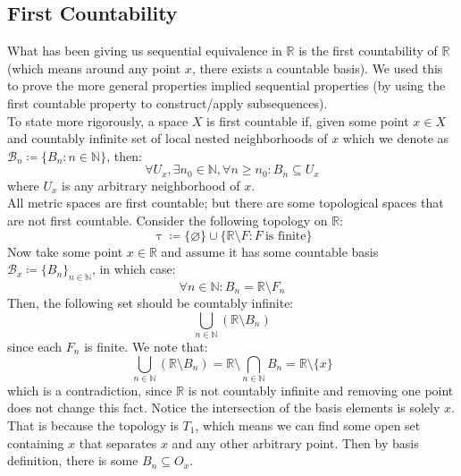 \documentclass[10pt,letterpaper]{article} %
\begin{document}
\subsection{First Countability}
What has been giving us sequential equivalence in $\mathbb{R}$ is the first countability of $\mathbb{R}$ (which means around any point $x$, there exists a countable basis). We used this to prove the more general properties implied sequential properties (by using the first countable property to construct/apply subsequences).\\

To state more rigorously, a space $X$ is first countable if, given some point $x \in X$ and countably infinite set of local nested neighborhoods of $x$ which we denote as $\mathcal{B}_n \coloneq \{B_n : n \in \mathbb{N}\}$, then:
\begin{equation*}
\forall U_x, \exists n_0 \in \mathbb{N}, \forall n \geqslant n_0: B_n \subseteq U_x
\end{equation*}
where $U_x$ is any arbitrary neighborhood of $x$.\\

All metric spaces are first countable; but there are some topological spaces that are not first countable. Consider the following topology on $\mathbb{R}$:
\begin{equation*}
\uptau \coloneq \{\varnothing\} \cup \{\mathbb{R} \setminus F: F \ \text{is finite}\}
\end{equation*}
Now take some point $x \in \mathbb{R}$ and assume it has some countable basis $\mathcal{B}_x \coloneq \{B_n\}_{n \in \mathbb{N}}$, in which case:
\begin{equation*}
\forall n \in \mathbb{N}: B_n = \mathbb{R}\setminus F_n
\end{equation*}
Then, the following set should be countably infinite:
\begin{equation*}
\bigcup_{n \in \mathbb{N}}(\mathbb{R}\setminus B_n)
\end{equation*}
since each $F_n$ is finite. We note that:
\begin{equation*}
\bigcup_{n \in \mathbb{N}}(\mathbb{R}\setminus B_n) = \mathbb{R} \setminus \bigcap_{n \in \mathbb{N}} B_n = \mathbb{R}\setminus \{x\}    
\end{equation*}
which is a contradiction, since $\mathbb{R}$ is not countably infinite and removing one point does not change this fact. Notice the intersection of the basis elements is solely $x$. That is because the topology is $T_1$, which means we can find some open set containing $x$ that separates $x$ and any other arbitrary point. Then by basis definition, there is some $B_n \subseteq O_x$.\\
\end{document}
